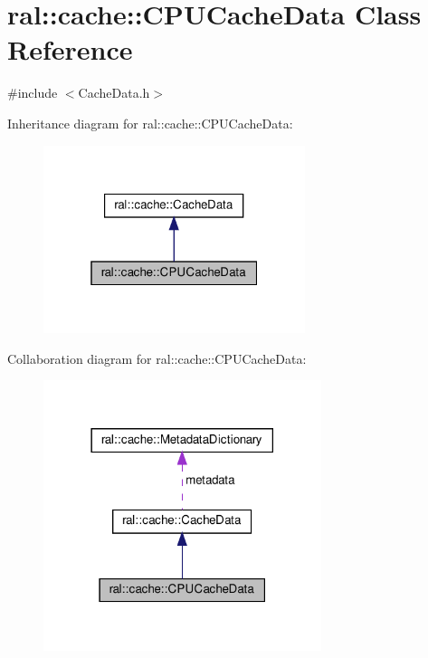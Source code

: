 \hypertarget{classral_1_1cache_1_1CPUCacheData}{}\section{ral\+:\+:cache\+:\+:C\+P\+U\+Cache\+Data Class Reference}
\label{classral_1_1cache_1_1CPUCacheData}


{\ttfamily \#include $<$Cache\+Data.\+h$>$}



Inheritance diagram for ral\+:\+:cache\+:\+:C\+P\+U\+Cache\+Data\+:\nopagebreak
\begin{figure}[H]
\begin{center}
\leavevmode
\includegraphics[width=217pt]{classral_1_1cache_1_1CPUCacheData__inherit__graph}
\end{center}
\end{figure}


Collaboration diagram for ral\+:\+:cache\+:\+:C\+P\+U\+Cache\+Data\+:\nopagebreak
\begin{figure}[H]
\begin{center}
\leavevmode
\includegraphics[width=230pt]{classral_1_1cache_1_1CPUCacheData__coll__graph}
\end{center}
\end{figure}
